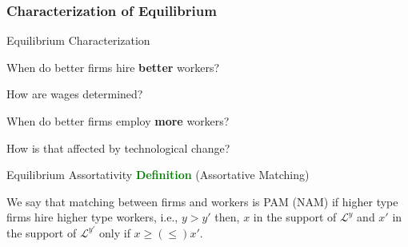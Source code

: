 \documentclass[notes,11pt, aspectratio=169]{beamer}
\newenvironment{wideitemize}{\itemize\addtolength{\itemsep}{10pt}}{\enditemize}
\begin{document}
\subsubsection{Characterization of Equilibrium}
\begin{frame}{Equilibrium Characterization}
	\begin{wideitemize}
		\item  When do better firms hire \textbf{better} workers?
		\item  How are wages determined?
		\item  When do better firms employ \textbf{more} workers?
		\item  How is that affected by technological change?
	\end{wideitemize}
	
\end{frame}

\begin{frame}{Equilibrium Assortativity}
	\textcolor{green}{\textbf{Definition}} (Assortative Matching) 
	\begin{wideitemize}
	\item We say that matching between firms and workers is PAM (NAM) if higher type firms hire higher type workers, i.e., $y>y'$ then, $x$ in the support of $\mathcal{L}^y$ and $x'$ in the support of $\mathcal{L}^{y'}$ only if $x\geq (\leq) x'$.
	\end{wideitemize}
\end{frame}
\end{document}
